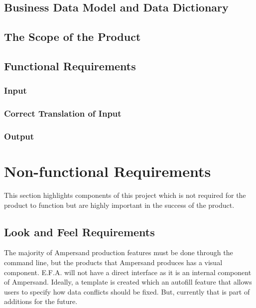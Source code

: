 \documentclass[12pt]{report}
\begin{document}
\section{Business Data Model and Data Dictionary}\label{sec:DataModel}

\section{The Scope of the Product}\label{sec:ScopeOfProduct}
\section{Functional Requirements}\label{sec:Functional}
\subsection{Input}
\subsection{Correct Translation of Input}
\subsection{Output}

\chapter{Non-functional Requirements}\label{ch:NonFunc}
This section highlights components of this project which is not required for 
the product to function but are highly important in the success of the product. 
\section{Look and Feel Requirements}\label{sec:LookAndFeel} 
The majority of Ampersand production features must be done through the command 
line, but the products that Ampersand produces has a visual component. E.F.A. 
will not have a direct interface as it is an internal component of Ampersand. 
Ideally, a template is created which an autofill feature that allows users to 
specify how data conflicts should be fixed. But, currently that is part of 
additions for the future. 
\end{document}
